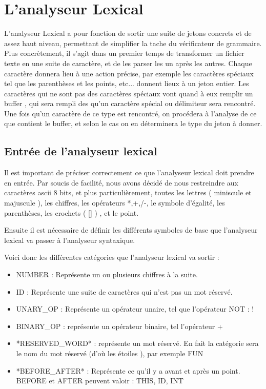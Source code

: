 \section{L'analyseur Lexical}

L'analyseur Lexical a pour fonction de sortir une suite de jetons concrets et de assez haut niveau, permettant de simplifier la tache du vérificateur de grammaire. Plus concrètement, il s'agit dans un premier temps de transformer un fichier texte en une suite de caractère, et de les parser les un après les autres. Chaque caractère donnera lieu à une action précise, par exemple les caractères spéciaux tel que les parenthèses et les points, etc... donnent lieux à un jeton entier.
Les caractères qui ne sont pas des caractères spéciaux vont quand à eux remplir un buffer , qui sera rempli des qu'un caractère spécial ou délimiteur sera rencontré. Une fois qu'un caractère de ce type est rencontré, on procédera à l'analyse de ce que contient le buffer, et selon le cas on en déterminera le type du jeton à donner.

\subsection{Entrée de l'analyseur lexical}

Il est important de préciser correctement ce que l'analyseur lexical doit prendre en entrée. Par soucis de facilité, nous avons décidé de nous restreindre aux caractères ascii 8 bits, et plus particulièrement, toutes les lettres ( miniscule et majuscule ), les chiffres, les opérateurs *,+,/-, le symbole d'égalité, les parenthèses, les crochets ( [] ) ,  et le point.

Ensuite il est nécessaire de définir les différents symboles de base que l'analyseur lexical va passer à l'analyseur syntaxique.

Voici donc les différentes catégories que l'analyseur lexical va sortir :

\begin{itemize}
	\item NUMBER  : Représente un ou plusieurs chiffres à la suite.
	\item ID : Représente une suite de caractères qui n'est pas un mot réservé.
	\item UNARY\_OP : Représente un opérateur unaire, tel que l'opérateur NOT : !
	\item BINARY\_OP : représente un opérateur binaire, tel l'opérateur +
	\item *RESERVED\_WORD* : représente un mot réservé. En fait la catégorie sera le nom du mot réservé (d'où les étoiles ), par exemple FUN
	\item *BEFORE\_AFTER* : Représente ce qu'il y a avant et après un point. BEFORE et AFTER peuvent valoir : THIS, ID, INT
\end{itemize}

